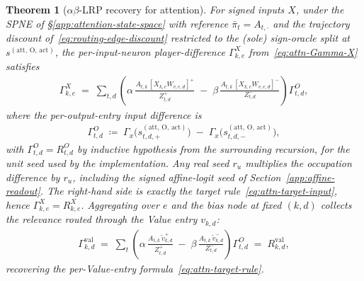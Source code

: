 \documentclass[twoside]{article}
\newcommand{\1}{\mathbf{1}}
\newtheorem{theorem}{Theorem}
\begin{document}
\begin{theorem}[$\alpha\beta$-\ac{LRP} recovery for attention]\label{thm:attn-ab-recovery}
For signed inputs $X$, under the SPNE of \S\ref{app:attention-state-space} with reference
$\bar\pi_t = A_{t,\cdot}$ and the trajectory discount of~\eqref{eq:routing-edge-discount}
restricted to the (sole) sign-oracle split at $s^{(\mathrm{att},\,\mathrm{O},\,\mathrm{act})}$, the
per-input-neuron player-difference $\Gamma^{X}_{k,e}$ from~\eqref{eq:attn-Gamma-X} satisfies
\begin{align}\label{eq:attn-ab-recovery}
    \Gamma^{X}_{k,e}
    \;=\;
    \sum_{t,d} \left(
    \alpha\, \frac{A_{t,k}\, [X_{k,e} W_{v,e,d}]^+}{Z_{t,d}^+}
    \;-\;
    \beta\, \frac{A_{t,k}\, [X_{k,e} W_{v,e,d}]^-}{Z_{t,d}^-}
    \right) \Gamma^{O}_{t,d},
\end{align}
where the per-output-entry input difference is
\begin{align}\label{eq:attn-Gamma-O}
    \Gamma^{O}_{t,d} \;\coloneqq\;
    \Gamma_x\!\bigl(s_{t,d,+}^{(\mathrm{att},\,\mathrm{O},\,\mathrm{act})}\bigr) \;-\;
    \Gamma_x\!\bigl(s_{t,d,-}^{(\mathrm{att},\,\mathrm{O},\,\mathrm{act})}\bigr),
\end{align}
with $\Gamma^{O}_{t,d} = R^{O}_{t,d}$ by inductive hypothesis from the surrounding recursion, for
the unit seed used by the implementation. Any real seed $r_u$ multiplies the occupation difference
by $r_u$, including the signed affine-logit seed of Section~\ref{app:affine-readout}. The right-hand side is exactly the target
rule~\eqref{eq:attn-target-input}, hence $\Gamma^{X}_{k,e} = R^{X}_{k,e}$. Aggregating over $e$ and
the bias node at fixed $(k,d)$ collects the relevance routed through the Value entry $v_{k,d}$:
\begin{align}\label{eq:attn-Gamma-V-corollary}
    \Gamma^{\mathrm{val}}_{k,d}
    \;=\;
    \sum_t \left( \alpha\, \frac{A_{t,k}\, \tilde{v}_{k,d}^+}{Z_{t,d}^+} \;-\; \beta\, \frac{A_{t,k}\,
    \tilde{v}_{k,d}^-}{Z_{t,d}^-} \right) \Gamma^{O}_{t,d}
    \;=\; R^{\mathrm{val}}_{k,d},
\end{align}
recovering the per-Value-entry formula~\eqref{eq:attn-target-rule}.
\end{theorem}
\end{document}
